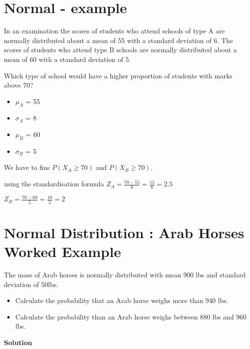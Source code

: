 \documentclass[]{report}
\begin{document}



\section{Normal - example}

In an examination the scores of students who attend schools of type A are
normally distributed about a mean of 55 with a standard deviation of 6. The
scores of students who attend type B schools are normally distributed about a
mean of 60 with a standard deviation of 5.

Which type of school would have a higher proportion of students with marks above 70?

\begin{itemize}
	\item $\mu_A$ = 55
	\item $\sigma_A$ = 8
	\item $\mu_B$ = 60
	\item $\sigma_B$ = 5
\end{itemize}

We have to fins $P(X_A \geq 70)$
and $P(X_B \geq 70)$.


using the standardisation formula
$Z_A = \frac{70 - 55}{6} = \frac{15}{6} = 2.5 $

$Z_B = \frac{70 - 60}{5} = \frac{10}{5} = 2 $



\section{Normal Distribution : Arab Horses Worked Example}
The mass of Arab horses is normally distributed with mean 900 lbs and standard deviation of 50lbs.
\begin{itemize}
	
	\item  Calculate the probability that an Arab horse weighs more than 940 lbs.
	\item Calculate the probability than an Arab horse weighs between 880 lbs and 960 lbs.
\end{itemize}

\noindent \textbf{Solution}\\
\end{document}
